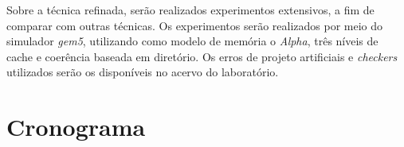 \documentclass{ufsc-thesis} %
\begin{document}
Sobre a técnica refinada, serão realizados experimentos extensivos, a fim de comparar com
outras técnicas. Os experimentos serão realizados por meio do simulador \textit{gem5},
utilizando como modelo de memória o \textit{Alpha}, três níveis de cache e coerência baseada em
diretório. Os erros de projeto artificiais e \textit{checkers} utilizados serão os disponíveis
no acervo do laboratório.

\chapter{Cronograma}
\noindent\resizebox{\textwidth}{!}{

}
\end{document}
